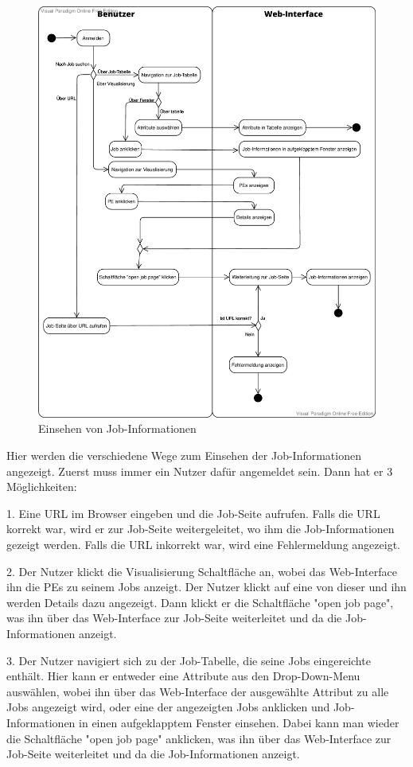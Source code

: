 \begin{figure}[H]
    \centering
    \includegraphics[width=\textwidth]{images-interface/get_infos.pdf}
    \caption{Einsehen von Job-Informationen}
\end{figure}
Hier werden die verschiedene Wege zum Einsehen der Job-Informationen angezeigt. Zuerst muss immer ein \gls{Nutzer} dafür angemeldet sein. Dann hat er 3 Möglichkeiten: 

1. Eine URL im Browser eingeben und die Job-Seite aufrufen. Falls die URL korrekt war, wird er zur Job-Seite weitergeleitet, wo ihm die Job-Informationen gezeigt werden. Falls die URL inkorrekt war, wird eine Fehlermeldung angezeigt.

2. Der \gls{Nutzer} klickt die Visualisierung Schaltfläche an, wobei das Web-Interface ihn die PEs zu seinem Jobs anzeigt. Der \gls{Nutzer} klickt auf eine von dieser und ihn werden Details dazu angezeigt. Dann klickt er die Schaltfläche "open job page", was ihn über das Web-Interface zur Job-Seite weiterleitet und da die Job-Informationen anzeigt.

3. Der \gls{Nutzer} navigiert sich zu der Job-Tabelle, die seine Jobs eingereichte enthält. Hier kann er entweder eine Attribute aus den Drop-Down-Menu auswählen, wobei ihn über das Web-Interface der ausgewählte Attribut zu alle Jobs angezeigt wird, oder eine der angezeigten Jobs anklicken und Job-Informationen in einen aufgeklapptem Fenster einsehen. Dabei kann man wieder die Schaltfläche "open job page" anklicken, was ihn über das Web-Interface zur Job-Seite weiterleitet und da die Job-Informationen anzeigt.
